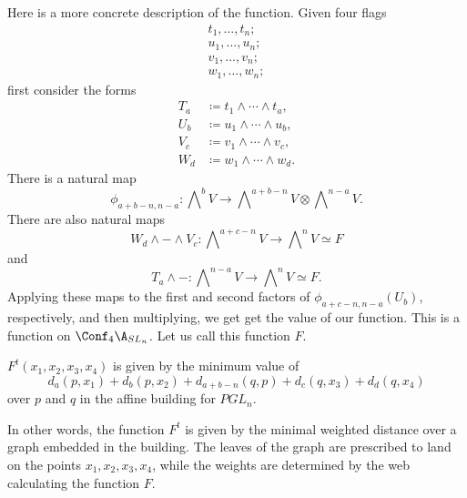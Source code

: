 Here is a more concrete description of the function. Given four flags 
\begin{gather*}
t_1, \dots, t_n;
\\
u_1, \dots, u_n;
\\
v_1, \dots, v_n;
\\
w_1, \dots, w_n;
\end{gather*}
first consider the forms
\begin{align*}
T_a &\coloneqq  t_1 \wedge \cdots \wedge t_a,
\\
U_b &\coloneqq  u_1 \wedge \cdots \wedge u_b,
\\
V_c &\coloneqq  v_1 \wedge \cdots \wedge v_c,
\\
W_d &\coloneqq  w_1 \wedge \cdots \wedge w_d.
\end{align*}
There is a natural map 
\[
\phi_{a+b-n, n-a}: \bigwedge\nolimits^{b} V \rightarrow \bigwedge\nolimits^{a+b-n} V \otimes \bigwedge\nolimits^{n-a} V.
\]
There are also natural maps 
\[
W_d \wedge - \wedge V_c : \bigwedge\nolimits^{a+c-n} V \rightarrow \bigwedge\nolimits^{n} V \simeq F
\] 
and 
\[
T_a \wedge - : \bigwedge\nolimits^{n-a} V \rightarrow \bigwedge\nolimits^{n} V \simeq F.
\]
Applying these maps to the first and second factors of $\phi_{a+c-n,n-a}(U_b)$, respectively, and then multiplying, we get get the value of our function. This is a function on $\Conf_4 \A_{SL_{n}}$. Let us call this function $F$.

\begin{conj} $F^t(x_1,x_2,x_3,x_4)$ is given by the minimum value of
\[
d_a(p,x_1) + d_b(p,x_2) + d_{a+b-n}(q,p) + d_c(q,x_3) + d_d(q,x_4)
\]
over $p$ and $q$ in the affine building for $PGL_n$.
\end{conj}

In other words, the function $F^t$ is given by the minimal weighted distance over a graph embedded in the building. The leaves of the graph are prescribed to land on the points $x_1, x_2, x_3, x_4$, while the weights are determined by the web calculating the function $F$.


